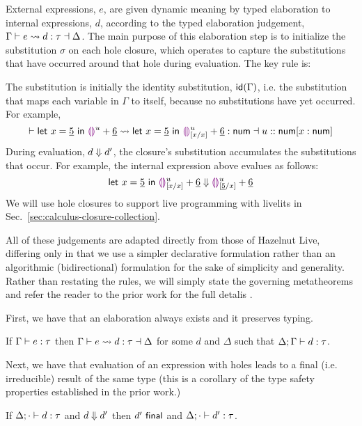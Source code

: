 External expressions, $e$, are given dynamic meaning by typed elaboration to internal expressions, $d$,
according to the typed elaboration judgement, $\elabs{\Gamma}{e}{d}{\tau}{\Delta}$.
The main purpose of this elaboration step is to initialize the substitution $\sigma$ on each hole closure,
which operates to capture
the substitutions that have occurred around that hole during evaluation. The key rule is:
\begin{mathpar}
\end{mathpar}
The substitution is initially the identity substitution, $\idof{\Gamma}$, i.e. the
substitution that maps each variable in $\Gamma$ to itself, because no substitutions have yet occurred. For example,
\[ \elabs{ }{\helet{x}{\hnum{5}}{\hehole{u}} + \hnum{6}}{\helet{x}{\hnum{5}}{\dehole{u}{[x/x]} + \hnum{6}}}{\tnum}{u :: \tnum[x : \tnum]} \]
During evaluation, $\evalsTo{d}{d'}$, the closure's substitution accumulates the substitutions that occur. For example,
the internal expression above evalues as follows:
\[
  \evalsTo{\helet{x}{\hnum{5}}{\dehole{u}{[x/x]} + \hnum{6}}}{
      \dehole{u}{[\hnum{5}/x]} + \hnum{6}
  }
\]
We will use hole closures to support live programming with livelits in Sec.~\ref{sec:calculus-closure-collection}.


All of these judgements are adapted directly from those of Hazelnut Live,
differing only in that we use a simpler declarative formulation rather than an algorithmic (bidirectional)
formulation for the sake of simplicity and generality. Rather than restating the rules, we will simply state the governing
metatheorems and refer the reader to the prior work for the full detalis \cite{HazelnutLive}.

First, we have that an elaboration always exists and it preserves typing.
\begin{theorem}
    If $\hasType{\Gamma}{e}{\tau}$ then $\elabs{\Gamma}{e}{d}{\tau}{\Delta}$ for some $d$ and $\Delta$ such
    that $\hasTypeD{\Delta}{\Gamma}{d}{\tau}$.
\end{theorem}

Next, we have that evaluation of an expression with holes leads to a final (i.e. irreducible) result of the same type (this is a corollary
of the type safety properties established in the prior work.)
\begin{theorem}[Preservation]
    If $\hasTypeD{\Delta}{\cdot}{d}{\tau}$ and $\evalsTo{d}{d'}$ then $\isFinal{d'}$ and $\hasTypeD{\Delta}{\cdot}{d'}{\tau}$.
\end{theorem}

